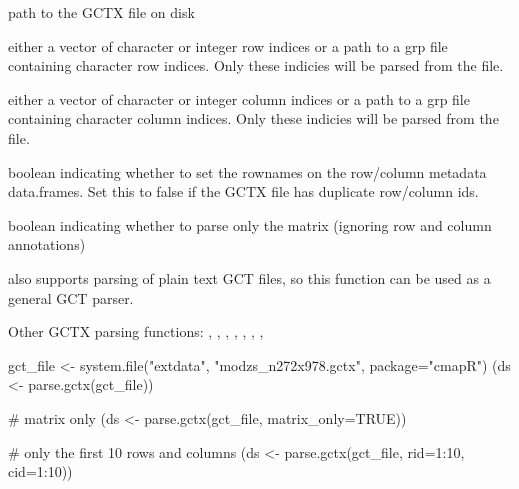 \documentclass[letterpaper]{book}
\begin{document}
\begin{Arguments}
\begin{ldescription}
\item[\code{fname}] path to the GCTX file on disk

\item[\code{rid}] either a vector of character or integer
row indices or a path to a grp file containing character
row indices. Only these indicies will be parsed from the
file.

\item[\code{cid}] either a vector of character or integer
column indices or a path to a grp file containing character
column indices. Only these indicies will be parsed from the
file.

\item[\code{set\_annot\_rownames}] boolean indicating whether to set the
rownames on the row/column metadata data.frames. Set this to 
false if the GCTX file has duplicate row/column ids.

\item[\code{matrix\_only}] boolean indicating whether to parse only
the matrix (ignoring row and column annotations)
\end{ldescription}
\end{Arguments}
%
\begin{Details}\relax
{} also supports parsing of plain text
GCT files, so this function can be used as a general GCT parser.
\end{Details}
%
\begin{SeeAlso}\relax
Other GCTX parsing functions: ,
, ,
,
,
, ,
\end{SeeAlso}
%
\begin{Examples}
\begin{ExampleCode}
gct_file <- system.file("extdata", "modzs_n272x978.gctx", package="cmapR")
(ds <- parse.gctx(gct_file))

# matrix only
(ds <- parse.gctx(gct_file, matrix_only=TRUE))

# only the first 10 rows and columns
(ds <- parse.gctx(gct_file, rid=1:10, cid=1:10))

\end{ExampleCode}
\end{Examples}
\end{document}
